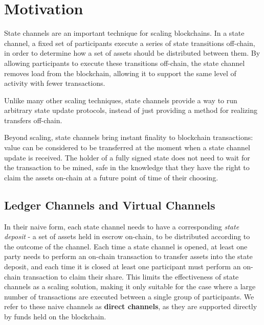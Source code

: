 \section{Motivation}

State channels are an important technique for scaling blockchains.
In a state channel, a fixed set of participants execute a series of state transitions off-chain, in order to determine how a set of assets should be distributed between them.
By allowing participants to execute these transitions off-chain, the state channel removes load from the blockchain, allowing it to support the same level of activity with fewer transactions.

Unlike many other scaling techniques, state channels provide a way to run arbitrary state update protocols, instead of just providing a method for realizing transfers off-chain.

Beyond scaling, state channels bring instant finality to blockchain transactions:
value can be considered to be transferred at the moment when a state channel update is received.
The holder of a fully signed state does not need to wait for the transaction to be mined, safe in the knowledge
that they have the right to claim the assets on-chain at a future point of time of their choosing.

\subsection{Ledger Channels and Virtual Channels}

In their naive form, each state channel needs to have a corresponding \textit{state deposit} - a set of assets held in escrow on-chain, to be distributed according to the outcome of the channel.
Each time a state channel is opened, at least one party needs to perform an on-chain transaction to transfer assets into the state deposit, and each time it is closed at least one participant must perform an on-chain transaction to claim their share.
This limits the effectiveness of state channels as a scaling solution, making it only suitable for the case where a large number of transactions are executed between a single group of participants.
We refer to these naive channels as \textbf{direct channels}, as they are supported directly by funds held on the blockchain.



